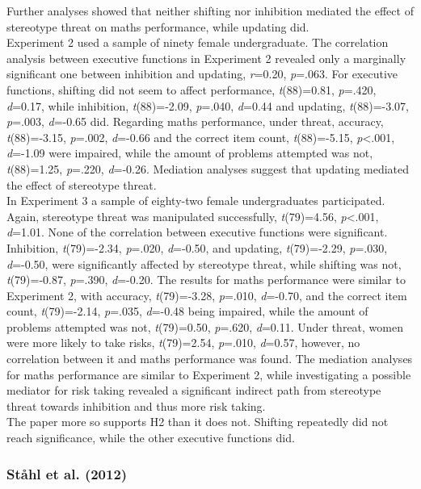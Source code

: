 \documentclass[
  stu,floatsintext]{apa7}
\begin{document}
Further analyses showed that neither shifting nor inhibition mediated the effect of stereotype threat on maths performance, while updating did.\\
Experiment 2 used a sample of ninety female undergraduate.
The correlation analysis between executive functions in Experiment 2 revealed only a marginally significant one between inhibition and updating, \emph{r}=0.20, \emph{p}=.063.
For executive functions, shifting did not seem to affect performance, \emph{t}(88)=0.81, \emph{p}=.420, \emph{d}=0.17, while inhibition, \emph{t}(88)=-2.09, \emph{p}=.040, \emph{d}=0.44 and updating, \emph{t}(88)=-3.07, \emph{p}=.003, \emph{d}=-0.65 did.
Regarding maths performance, under threat, accuracy, \emph{t}(88)=-3.15, \emph{p}=.002, \emph{d}=-0.66 and the correct item count, \emph{t}(88)=-5.15, \emph{p}\textless.001, \emph{d}=-1.09 were impaired, while the amount of problems attempted was not, \emph{t}(88)=1.25, \emph{p}=.220, \emph{d}=-0.26.
Mediation analyses suggest that updating mediated the effect of stereotype threat.\\
In Experiment 3 a sample of eighty-two female undergraduates participated.
Again, stereotype threat was manipulated successfully, \emph{t}(79)=4.56, \emph{p}\textless.001, \emph{d}=1.01.
None of the correlation between executive functions were significant.
Inhibition, \emph{t}(79)=-2.34, \emph{p}=.020, \emph{d}=-0.50, and updating, \emph{t}(79)=-2.29, \emph{p}=.030, \emph{d}=-0.50, were significantly affected by stereotype threat, while shifting was not, \emph{t}(79)=-0.87, \emph{p}=.390, \emph{d}=-0.20.
The results for maths performance were similar to Experiment 2, with accuracy, \emph{t}(79)=-3.28, \emph{p}=.010, \emph{d}=-0.70, and the correct item count, \emph{t}(79)=-2.14, \emph{p}=.035, \emph{d}=-0.48 being impaired, while the amount of problems attempted was not, \emph{t}(79)=0.50, \emph{p}=.620, \emph{d}=0.11.
Under threat, women were more likely to take risks, \emph{t}(79)=2.54, \emph{p}=.010, \emph{d}=0.57, however, no correlation between it and maths performance was found.
The mediation analyses for maths performance are similar to Experiment 2, while investigating a possible mediator for risk taking revealed a significant indirect path from stereotype threat towards inhibition and thus more risk taking.\\
The paper more so supports H2 than it does not. Shifting repeatedly did not reach significance, while the other executive functions did.

\subsubsection{Ståhl et al. (2012)}\label{stahlrolepreventionfocus2012}
\end{document}
